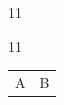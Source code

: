 \documentclass[paper=A4]{ropas-poster}
\begin{document}
\begin{postergrid}{1}{1}
\begin{posterblock}{1}{1}
\begin{tabular*}{80bp}{@{\extracolsep{\fill}}cc}A&B\end{tabular*}
\end{posterblock}
\end{postergrid}
\end{document}
